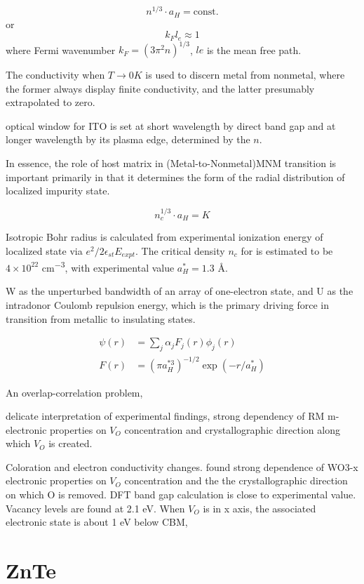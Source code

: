 \[
n^{1/3}\cdot a_H = \text{const.}
\]
or 
\[
k_Fl_e \approx 1
\]
where Fermi wavenumber $k_F = (3\pi^2n)^{1/3}$, $le$ is the mean free path.
 
The conductivity when $T\rightarrow 0K$ is used to discern metal from nonmetal, where the former always display finite conductivity, and the latter presumably extrapolated to zero. 

optical window for ITO is set at short wavelength by direct band gap and at longer wavelength by its plasma edge, determined by the $n$. 

In essence, the role of host matrix in (Metal-to-Nonmetal)MNM transition is important primarily in that it determines the form of the radial distribution of localized impurity state.\cite{Edwards1978}

\[
n_c^{1/3}\cdot a_H = K
\]

Isotropic Bohr radius is calculated from experimental ionization energy of localized state via $e^2/2\epsilon_{st} E_{expt}$.
The critical density $n_c$ for  is estimated to be $4\times 10^{22}$ \si{cm^{-3}}, with experimental value $a_H^* = 1.3$ \si{\angstrom}. 

W as the unperturbed bandwidth of an array of one-electron state, and U as the intradonor Coulomb repulsion energy, which is the primary driving force in transition from metallic to insulating states. 


\begin{align}
\psi(r) &= \sum_j \alpha_j F_j(r)\phi_j(r)\\
F(r) &= (\pi a_H^{*3})^{-1/2} \exp(-r/a_H^*)
\end{align}

An overlap-correlation problem, 

delicate interpretation of experimental findings, strong dependency of RM m- electronic properties on $V_O$ concentration and crystallographic direction along which $V_O$ is created.\cite{Wang2011b} 

Coloration and electron conductivity changes. \citeauthor{Wang2011b} found strong dependence of WO3-x electronic properties on $V_O$ concentration and the the crystallographic direction on which O is removed. DFT band gap calculation is close to experimental value. Vacancy levels are found at 2.1 eV. When $V_O$ is in x axis, the associated electronic state is about 1 eV below CBM, 

\section{ZnTe}

